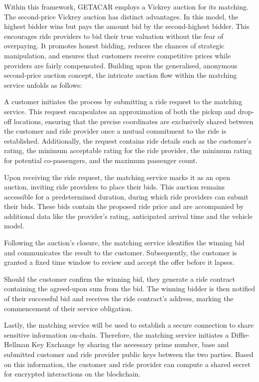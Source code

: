 Within this framework, GETACAR employs a Vickrey auction for its matching. The second-price Vickrey auction has distinct advantages. In this model, the highest bidder wins but pays the amount bid by the second-highest bidder. This encourages ride providers to bid their true valuation without the fear of overpaying. It promotes honest bidding, reduces the chances of strategic manipulation, and ensures that customers receive competitive prices while providers are fairly compensated. Building upon the generalised, anonymous second-price auction concept, the intricate auction flow within the matching service unfolds as follows:

A customer initiates the process by submitting a ride request to the matching service. This request encapsulates an approximation of both the pickup and drop-off locations, ensuring that the precise coordinates are exclusively shared between the customer and ride provider once a mutual commitment to the ride is established. Additionally, the request contains ride details such as the customer's rating, the minimum acceptable rating for the ride provider, the minimum rating for potential co-passengers, and the maximum passenger count.

Upon receiving the ride request, the matching service marks it as an open auction, inviting ride providers to place their bids. This auction remains accessible for a predetermined duration, during which ride providers can submit their bids. These bids contain the proposed ride price and are accompanied by additional data like the provider's rating, anticipated arrival time and the vehicle model.

Following the auction's closure, the matching service identifies the winning bid and communicates the result to the customer. Subsequently, the customer is granted a fixed time window to review and accept the offer before it lapses.

Should the customer confirm the winning bid, they generate a ride contract containing the agreed-upon sum from the bid. The winning bidder is then notified of their successful bid and receives the ride contract's address, marking the commencement of their service obligation.

Lastly, the matching service will be used to establish a secure connection to share sensitive information on-chain. Therefore, the matching service initiates a Diffie-Hellman Key Exchange by sharing the necessary prime number, base and submitted customer and ride provider public keys between the two parties. Based on this information, the customer and ride provider can compute a shared secret for encrypted interactions on the blockchain.

